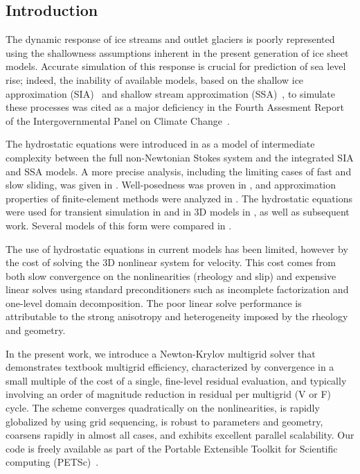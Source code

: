 \documentclass[draft,lineno,jgrga]{AGUTeX}
\begin{document}
\begin{article}
\section{Introduction}
The dynamic response of ice streams and outlet glaciers is poorly represented using the shallowness
assumptions inherent in the present generation of ice sheet models.  Accurate simulation of this
response is crucial for prediction of sea level rise; indeed, the inability of available models, based on
the shallow ice approximation (SIA)~\citep{hutter1983tgm} and shallow stream approximation
(SSA)~\citep{morland1987unconfined,weis1999theory}, to simulate these processes was cited as a major
deficiency in the Fourth Assesment Report of the Intergovernmental Panel on Climate Change~\citep{ipcc2007ar4-syr}.

The hydrostatic equations were introduced in \cite{blatter1995vas} as a model of intermediate complexity between the full non-Newtonian Stokes system and the integrated SIA and SSA models.  A more precise analysis, including the limiting cases of fast and slow sliding, was given in \cite{schoof2010thin}.  Well-posedness was proven in \cite{colinge1999strongly}, and approximation properties of finite-element methods were analyzed in \cite{glowinski2003approximation,chow2004finite}.  The hydrostatic equations were used for transient simulation in \cite{pattyn2002tgr} and in 3D models in \cite{pattyn2003ntd}, as well as subsequent work. Several models of this form were compared in \cite{pattyn2008beh}.

The use of hydrostatic equations in current models has been limited, however by the cost of solving the 3D nonlinear system for velocity.  This cost comes from both slow convergence on the
nonlinearities (rheology and slip) and expensive linear solves using standard preconditioners such
as incomplete factorization and one-level domain decomposition.  The poor linear solve performance is
attributable to the strong anisotropy and heterogeneity imposed by the rheology and geometry.

In the present work, we introduce a Newton-Krylov multigrid solver that demonstrates textbook
multigrid efficiency, characterized by convergence in a small multiple of the cost of a single,
fine-level residual evaluation, and typically involving an order of magnitude reduction in residual
per multigrid (V or F) cycle.  The scheme converges quadratically on the nonlinearities, is rapidly
globalized by using grid sequencing, is robust to parameters and geometry, coarsens rapidly in
almost all cases, and exhibits excellent parallel scalability.  Our code is freely available as part
of the Portable Extensible Toolkit for Scientific computing (PETSc)~\citep{petsc-web-page}.


\end{article}
\end{document}
